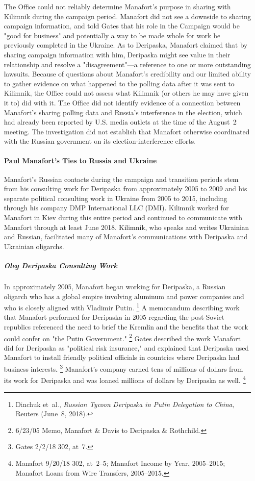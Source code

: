 The Office could not reliably determine Manafort's purpose in sharing with Kilimnik during the campaign period.
Manafort
did not see a downside to sharing campaign information, and told Gates that his role in the Campaign would be "good for business" and potentially a way to be made whole for work he previously completed in the Ukraine.
As to Deripaska, Manafort claimed that by sharing campaign information with him, Deripaska might see value in their relationship and resolve a "disagreement"---a reference to one or more outstanding lawsuits.
Because of questions about Manafort's credibility and our limited ability to gather evidence on what happened to the polling data after it was sent to Kilimnik, the Office could not assess what Kilimnik (or others he may have given it to) did with it.
The Office did not identify evidence of a connection between Manafort's sharing polling data and Russia's interference in the election, which had already been reported by U.S. media outlets at the time of the August~2 meeting.
The investigation did not establish that Manafort otherwise coordinated with the Russian government on its election-interference efforts.

\paragraph{Paul Manafort's Ties to Russia and Ukraine}

Manafort's Russian contacts during the campaign and transition periods stem from his consulting work for Deripaska from approximately 2005 to 2009 and his separate political consulting work in Ukraine from 2005 to 2015, including through his company DMP International LLC (DMI).
Kilimnik worked for Manafort in Kiev during this entire period and continued to communicate with Manafort through at least June 2018.
Kilimnik, who speaks and writes Ukrainian and Russian, facilitated many of Manafort's communications with Deripaska and Ukrainian oligarchs.

\subparagraph{Oleg Deripaska Consulting Work}

In approximately 2005, Manafort began working for Deripaska, a Russian oligarch who has a global empire involving aluminum and power companies and who is closely aligned with Vladimir Putin.%
\footnote{Dinchuk et~al., \textit{Russian Tycoon Deripaska in Putin Delegation to China}, Reuters (June~8, 2018).}
A memorandum describing work that Manafort performed for Deripaska in 2005 regarding the post-Soviet republics referenced the need to brief the Kremlin and the benefits that the work could confer on "the Putin Government."%
\footnote{6/23/05 Memo, Manafort \& Davis to Deripaska \& Rothchild.}
Gates described the work Manafort did for Deripaska as "political risk insurance," and explained that Deripaska used Manafort to install friendly political officials in countries where Deripaska had business interests.%
\footnote{Gates 2/2/18 302, at~7.}
Manafort's company earned tens of millions of dollars from its work for Deripaska and was loaned millions of dollars by Deripaska as well.%
\footnote{Manafort 9/20/18 302, at~2--5;
Manafort Income by Year, 2005--2015;
Manafort Loans from Wire Transfers, 2005--2015.}

